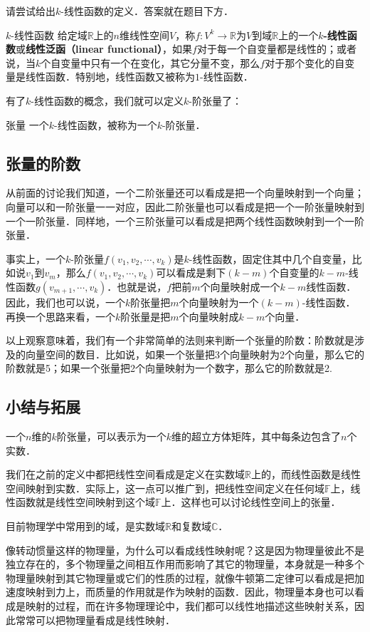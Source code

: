 \begin{exercise}{}
请尝试给出$k$-线性函数的定义．答案就在题目下方．
\end{exercise}

\begin{definition}{$k$-线性函数}
给定域$\mathbb{R}$上的$n$维线性空间$V$，称$f:V^k\rightarrow \mathbb{R}$为$V$到域$\mathbb{R}$上的一个\textbf{$k$-线性函数}或\textbf{线性泛函（linear functional）}，如果$f$对于每一个自变量都是线性的；或者说，当$k$个自变量中只有一个在变化，其它分量不变，那么$f$对于那个变化的自变量是线性函数．特别地，线性函数又被称为$1$-线性函数．
\end{definition}

有了$k$-线性函数的概念，我们就可以定义$k$-阶张量了：

\begin{definition}{张量}
一个$k$-线性函数，被称为一个$k$-阶张量．
\end{definition}

\subsection{张量的阶数}

从前面的讨论我们知道，一个二阶张量还可以看成是把一个向量映射到一个向量；向量可以和一阶张量一一对应，因此二阶张量也可以看成是把一个一阶张量映射到一个一阶张量．同样地，一个三阶张量可以看成是把两个线性函数映射到一个一阶张量．

事实上，一个$k$-阶张量$f({v}_1, {v}_2, \cdots,{v}_k)$是$k$-线性函数，固定住其中几个自变量，比如说${v}_1$到${v}_m$，那么$f({v}_1, {v}_2,\cdots,{v}_k)$可以看成是剩下$(k-m)$个自变量的$k-m$-线性函数$g({v}_{m+1}, \cdots,{v}_k)$．也就是说，$f$把前$m$个向量映射成一个$k-m$线性函数．因此，我们也可以说，一个$k$阶张量把$m$个向量映射为一个$(k-m)$-线性函数．再换一个思路来看，一个$k$阶张量是把$m$个向量映射成$k-m$个向量．

以上观察意味着，我们有一个非常简单的法则来判断一个张量的阶数：阶数就是涉及的向量空间的数目．比如说，如果一个张量把3个向量映射为2个向量，那么它的阶数就是5；如果一个张量把2个向量映射为一个数字，那么它的阶数就是2. 

\subsection{小结与拓展}

一个$n$维的$k$阶张量，可以表示为一个$k$维的超立方体矩阵，其中每条边包含了$n$个实数．

我们在之前的定义中都把线性空间看成是定义在实数域$\mathbb{R}$上的，而线性函数是线性空间映射到实数．实际上，这一点可以推广到，把线性空间定义在任何域$\mathbb{F}$上，线性函数就是线性空间映射到这个域$\mathbb{F}$上．这样也可以讨论线性空间上的张量．

目前物理学中常用到的域，是实数域$\mathbb{R}$和复数域$\mathbb{C}$．

像转动惯量这样的物理量，为什么可以看成线性映射呢？这是因为物理量彼此不是独立存在的，多个物理量之间相互作用而影响了其它的物理量，本身就是一种多个物理量映射到其它物理量或它们的性质的过程，就像牛顿第二定律可以看成是把加速度映射到力上，而质量的作用就是作为映射的函数．因此，物理量本身也可以看成是映射的过程，而在许多物理理论中，我们都可以线性地描述这些映射关系，因此常常可以把物理量看成是线性映射．
